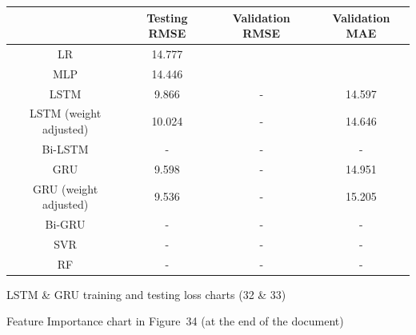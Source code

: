 \begin{center}
    \begin{tabular}{ |c|c|c|c| }
        \hline
        & Testing RMSE & Validation RMSE & Validation MAE \\
        \hline
        LR                     & 14.777       &                 &                \\
        \hline
        MLP                    & 14.446       &                 &                \\
        \hline
        LSTM                   & 9.866        & -               & 14.597         \\
        \hline
        LSTM (weight adjusted) & 10.024       & -               & 14.646         \\
        \hline
        Bi-LSTM                & -            & -               & -              \\
        \hline
        GRU                    & 9.598        & -               & 14.951         \\
        \hline
        GRU (weight adjusted)  & 9.536        & -               & 15.205         \\
        \hline
        Bi-GRU                 & -            & -               & -              \\
        \hline
        SVR                    & -            & -               & -              \\
        \hline
        RF                     & -            & -               & -              \\
        \hline
    \end{tabular}
\end{center}

LSTM \& GRU training and testing loss charts (32 \& 33) %

Feature Importance chart in Figure~34 (at the end of the document) %


